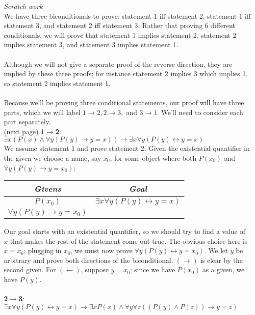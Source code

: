 \documentclass{report}
\theoremstyle{definition}
\begin{document}
\textit{Scratch work}\\
We have three biconditionals to prove: statement 1 iff statement 2, statement 1 iff statement 3, and statement 2 iff statement 3. Rather that proving 6 different conditionals, 
we will prove that statement 1 implies statement 2, 
statement 2 implies statement 3, and statement 3 implies statement 1.\\
\vspace{1mm}\\
Although we will not give a separate proof of the reverse direction, they are implied by these three proofs; 
for instance statement 2 implies 3 which implies 1, so statement 2 implies statement 1.\\
\vspace{1mm}\\
Because we'll be proving three conditional statements, our proof will have three parts, which we will label
$1\to2,2\to3,$ and $3\to1$. We'll need to consider each part separately.\\
(next page)\newpage
\noindent\textbf{1$\to$2}: $\exists x(P(x)\land\forall y(P(y)\to y=x))\to\exists x\forall y(P(y)\leftrightarrow y=x)$\\
We assume statement 1 and prove statement 2. Given the existential quantifier in the given we choose a name, say $x_0$, for some object where both $P(x_0)$ and $\forall y(P(y)\to y=x_0)$:
\begin{center}
\begin{tabular}{c|c}
\textit{Givens}&\textit{Goal}\\
\hline
$P(x_0)$&$\exists x\forall y(P(y)\leftrightarrow y=x)$\\
$\forall y(P(y)\to y=x_0)$&
\end{tabular}
\end{center}
Our goal starts with an existential quantifier, so we should try to find a value of $x$ 
that makes the rest of the statement come out true. The obvious choice here is $x=x_0$; plugging in $x_0$, we must now prove $\forall y(P(y)\leftrightarrow y=x_0)$. We let $y$ be arbitrary and prove
both directions of the biconditional. $(\rightarrow)$ is clear by the second given. For $(\leftarrow)$, suppose $y=x_0$; since we have $P(x_0)$ as a given, we have $P(y)$.\\
\vspace{1mm}\\
\textbf{2$\to$3}: $\exists x\forall y(P(y)\leftrightarrow y=x)\to\exists xP(x)\land\forall y\forall z((P(y)\land P(z))\to y=z)$ \\
\end{document}
